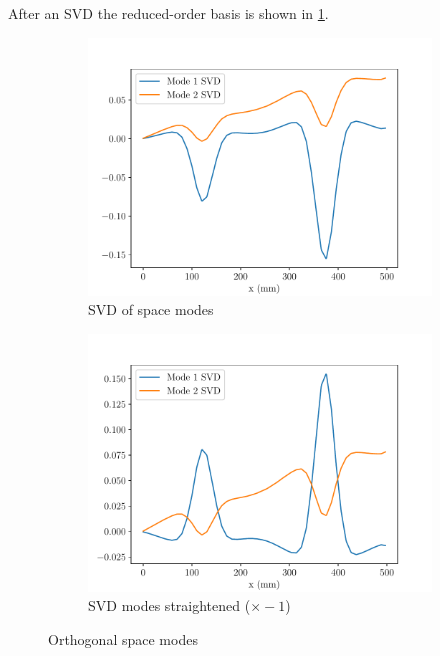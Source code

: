 After an SVD the reduced-order basis is shown in \ref{fig:SVDROM_2Modes}.
\begin{figure}
\begin{subfigure}[t]{0.5\linewidth}
    \centering
    \includegraphics[width=\linewidth]{Figures/SVD_2_Modes.pdf}
    \caption{SVD of space modes }
\end{subfigure}
  \begin{subfigure}[t]{0.5\linewidth}
    \centering
    \includegraphics[width=\linewidth]{Figures/SVD_2_Modes_neg.pdf}
    \caption{SVD modes straightened ($\times -1$)}
\end{subfigure}  
    \caption{Orthogonal space modes}
    \label{fig:SVDROM_2Modes}
\end{figure}



